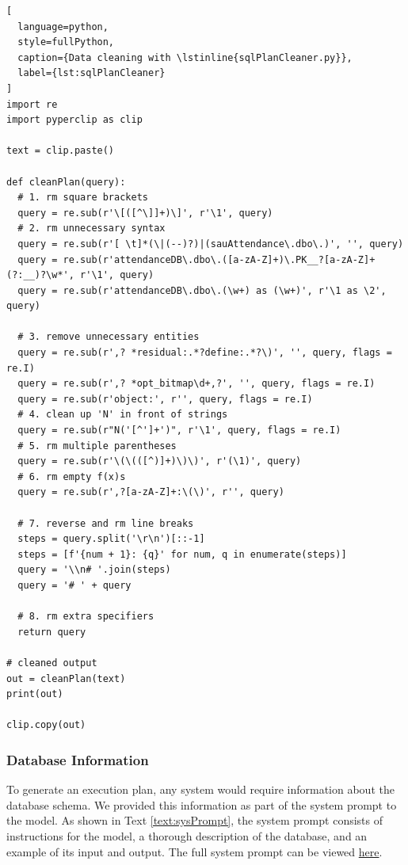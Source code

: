 \begin{lstlisting}[
  language=python,
  style=fullPython,
  caption={Data cleaning with \lstinline{sqlPlanCleaner.py}},
  label={lst:sqlPlanCleaner}
]
import re
import pyperclip as clip

text = clip.paste()

def cleanPlan(query):
  # 1. rm square brackets
  query = re.sub(r'\[([^\]]+)\]', r'\1', query)
  # 2. rm unnecessary syntax
  query = re.sub(r'[ \t]*(\|(--)?)|(sauAttendance\.dbo\.)', '', query)
  query = re.sub(r'attendanceDB\.dbo\.([a-zA-Z]+)\.PK__?[a-zA-Z]+(?:__)?\w*', r'\1', query)
  query = re.sub(r'attendanceDB\.dbo\.(\w+) as (\w+)', r'\1 as \2', query)

  # 3. remove unnecessary entities
  query = re.sub(r',? *residual:.*?define:.*?\)', '', query, flags = re.I)
  query = re.sub(r',? *opt_bitmap\d+,?', '', query, flags = re.I)
  query = re.sub(r'object:', r'', query, flags = re.I)
  # 4. clean up 'N' in front of strings
  query = re.sub(r"N('[^']+')", r'\1', query, flags = re.I)
  # 5. rm multiple parentheses
  query = re.sub(r'\(\(([^)]+)\)\)', r'(\1)', query)
  # 6. rm empty f(x)s
  query = re.sub(r',?[a-zA-Z]+:\(\)', r'', query)
  
  # 7. reverse and rm line breaks
  steps = query.split('\r\n')[::-1]
  steps = [f'{num + 1}: {q}' for num, q in enumerate(steps)]
  query = '\\n# '.join(steps)
  query = '# ' + query

  # 8. rm extra specifiers
  return query

# cleaned output
out = cleanPlan(text)
print(out)

clip.copy(out)
\end{lstlisting}

\subsubsection{Database Information}
To generate an execution plan, any system would require information about the database schema. We provided this information as part of the system prompt to the model. As shown in Text \ref{text:sysPrompt}, the system prompt consists of instructions for the model, a thorough description of the database, and an example of its input and output. The full system prompt can be viewed \href{https://github.com/MatousAc/llamaExecPlan/blob/main/src/sysPrompt.txt}{here}.

